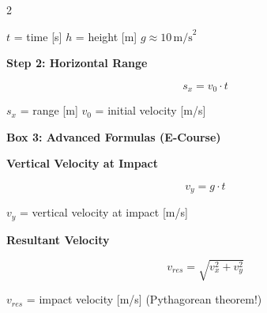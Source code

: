 \documentclass[10pt, a4paper]{article}
\newcommand{\fachfarbe}{physik}
\newcommand{\abschnitt}[1]{%
    \vspace{8pt}
    \noindent\textbf{\textcolor{\fachfarbe}{#1}}
    \vspace{4pt}
}
\begin{document}
\begin{multicols}{2}
\begin{formelbox}
\vspace{2pt}
\footnotesize
$t$ = time [s] \quad $h$ = height [m] \quad $g \approx 10\,\text{m/s}^2$
\end{formelbox}

\vspace{4pt}

\begin{formelbox}
\textbf{Step 2: Horizontal Range}
\vspace{2pt}

\begin{equation*}
s_x = v_0 \cdot t
\end{equation*}

\vspace{2pt}
\footnotesize
$s_x$ = range [m] \quad $v_0$ = initial velocity [m/s]
\end{formelbox}

\vspace{4pt}


\abschnitt{Box 3: Advanced Formulas (E-Course)}

\begin{formelbox}
\textbf{Vertical Velocity at Impact}
\vspace{2pt}

\begin{equation*}
v_y = g \cdot t
\end{equation*}

\vspace{2pt}
\footnotesize
$v_y$ = vertical velocity at impact [m/s]
\end{formelbox}

\vspace{4pt}

\begin{formelbox}
\textbf{Resultant Velocity}
\vspace{2pt}

\begin{equation*}
v_{res} = \sqrt{v_x^2 + v_y^2}
\end{equation*}

\vspace{2pt}
\footnotesize
$v_{res}$ = impact velocity [m/s] \quad (Pythagorean theorem!)
\end{formelbox}

\vspace{4pt}


\end{multicols}
\end{document}

